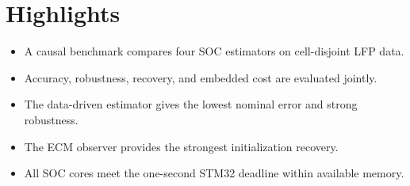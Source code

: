\documentclass[11pt,a4paper]{article}
\begin{document}
\section*{Highlights}

\begin{itemize}
  \item A causal benchmark compares four SOC estimators on cell-disjoint LFP data.
  \item Accuracy, robustness, recovery, and embedded cost are evaluated jointly.
  \item The data-driven estimator gives the lowest nominal error and strong robustness.
  \item The ECM observer provides the strongest initialization recovery.
  \item All SOC cores meet the one-second STM32 deadline within available memory.
\end{itemize}
\end{document}
